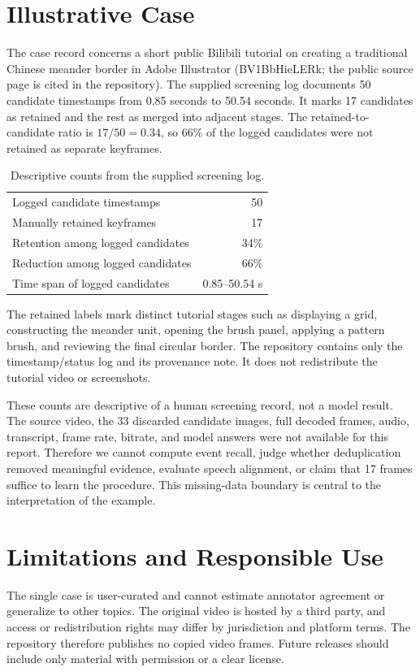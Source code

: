 \documentclass[11pt]{article}
\begin{document}
\section{Illustrative Case}
The case record concerns a short public Bilibili tutorial on creating a traditional Chinese meander border in Adobe Illustrator (BV1BbHieLERk; the public source page is cited in the repository). The supplied screening log documents 50 candidate timestamps from 0.85 seconds to 50.54 seconds. It marks 17 candidates as retained and the rest as merged into adjacent stages. The retained-to-candidate ratio is $17/50=0.34$, so 66\% of the logged candidates were not retained as separate keyframes.

\begin{table}[h]
\centering
\caption{Descriptive counts from the supplied screening log.}
\begin{tabular}{lr}
\toprule
Logged candidate timestamps & 50 \\
Manually retained keyframes & 17 \\
Retention among logged candidates & 34\% \\
Reduction among logged candidates & 66\% \\
Time span of logged candidates & 0.85--50.54 s \\
\bottomrule
\end{tabular}
\end{table}

The retained labels mark distinct tutorial stages such as displaying a grid, constructing the meander unit, opening the brush panel, applying a pattern brush, and reviewing the final circular border. The repository contains only the timestamp/status log and its provenance note. It does not redistribute the tutorial video or screenshots.

These counts are descriptive of a human screening record, not a model result. The source video, the 33 discarded candidate images, full decoded frames, audio, transcript, frame rate, bitrate, and model answers were not available for this report. Therefore we cannot compute event recall, judge whether deduplication removed meaningful evidence, evaluate speech alignment, or claim that 17 frames suffice to learn the procedure. This missing-data boundary is central to the interpretation of the example.

\section{Limitations and Responsible Use}
The single case is user-curated and cannot estimate annotator agreement or generalize to other topics. The original video is hosted by a third party, and access or redistribution rights may differ by jurisdiction and platform terms. The repository therefore publishes no copied video frames. Future releases should include only material with permission or a clear license.
\end{document}
